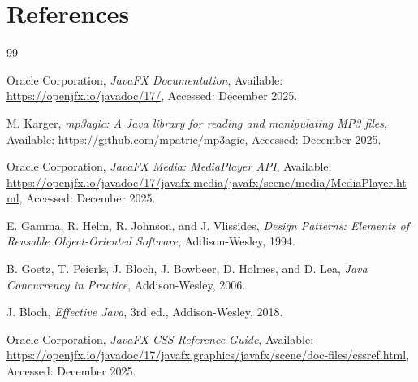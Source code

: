 ﻿\documentclass[12pt]{report}
\begin{document}
\chapter*{References}

\begin{thebibliography}{99}

Oracle Corporation,
\textit{JavaFX Documentation},
Available: \url{https://openjfx.io/javadoc/17/},
Accessed: December 2025.

M. Karger,
\textit{mp3agic: A Java library for reading and manipulating MP3 files},
Available: \url{https://github.com/mpatric/mp3agic},
Accessed: December 2025.

Oracle Corporation,
\textit{JavaFX Media: MediaPlayer API},
Available: \url{https://openjfx.io/javadoc/17/javafx.media/javafx/scene/media/MediaPlayer.html},
Accessed: December 2025.

E. Gamma, R. Helm, R. Johnson, and J. Vlissides,
\textit{Design Patterns: Elements of Reusable Object-Oriented Software},
Addison-Wesley, 1994.

B. Goetz, T. Peierls, J. Bloch, J. Bowbeer, D. Holmes, and D. Lea,
\textit{Java Concurrency in Practice},
Addison-Wesley, 2006.

J. Bloch,
\textit{Effective Java}, 3rd ed.,
Addison-Wesley, 2018.

Oracle Corporation,
\textit{JavaFX CSS Reference Guide},
Available: \url{https://openjfx.io/javadoc/17/javafx.graphics/javafx/scene/doc-files/cssref.html},
Accessed: December 2025.

\end{thebibliography}
\end{document}
